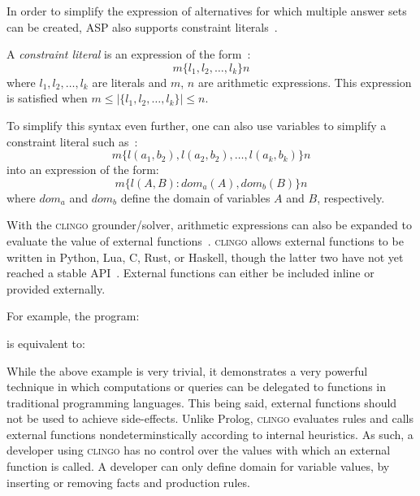 In order to simplify the expression of alternatives for which multiple answer sets can be created, ASP also supports constraint literals~\citep{balduccini_asp_2011}.

\begin{definition}
    A \textit{constraint literal} is an expression of the form~\citep{balduccini_asp_2011}:
    \begin{equation}
        m\{l_1,l_2, \dots, l_k\}n
    \end{equation}
    where $ l_1,l_2, \dots, l_k $ are literals and $m$, $n$ are arithmetic expressions.
    This expression is satisfied when $m \le |\{ l_1,l_2, \dots, l_k\}| \le n$.

    To simplify this syntax even further, one can also use variables to simplify a constraint literal such as~\citep{balduccini_asp_2011}:
    \begin{equation}
        m\{l(a_1, b_2),l(a_2,b_2), \dots, l(a_k, b_k)\}n
    \end{equation}
    into an expression of the form:
    \begin{equation}
        m\{l(A, B) : dom_a(A), dom_b(B)\}n
    \end{equation}
    where $dom_a$ and $dom_b$ define the domain of variables $A$ and $B$, respectively.
\end{definition}

With the \textsc{clingo} grounder/solver\footnotemark, arithmetic expressions can also be expanded to evaluate the value of external functions~\citep{gebser_potassco_2019}.
\textsc{clingo} allows external functions to be written in Python, Lua, C, Rust, or Haskell, though the latter two have not yet reached a stable API~\citep{roland_kaminski_potasscoclingo_2020,sven_thiele_potasscoclingo-rs_2020,paul_ogris_tsahytclingo-haskell_2020}.
External functions can either be included inline or provided externally\footnotemark.

For example, the program:

is equivalent to:


While the above example is very trivial, it demonstrates a very powerful technique in which computations or queries can be delegated to functions in traditional programming languages.
This being said, external functions should not be used to achieve side-effects.
Unlike Prolog, \textsc{clingo} evaluates rules and calls external functions nondeterminstically according to internal heuristics.
As such, a developer using \textsc{clingo} has no control over the values with which an external function is called.
A developer can only define domain for variable values, by inserting or removing facts and production rules.

